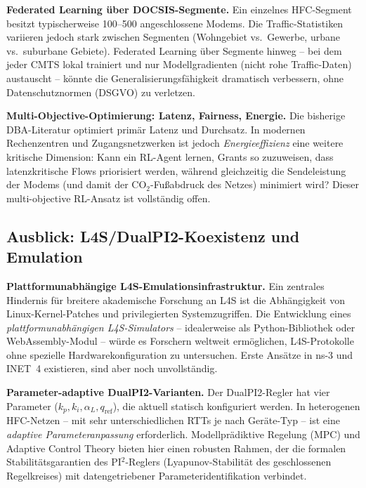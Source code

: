 ﻿\documentclass[a4paper,12pt]{article}
\theoremstyle{definition}
\begin{document}
\textbf{Federated Learning \"{u}ber DOCSIS-Segmente.}
Ein einzelnes HFC-Segment besitzt typischerweise 100--500 angeschlossene Modems.
Die Traffic-Statistiken variieren jedoch stark zwischen Segmenten (Wohngebiet
vs.\ Gewerbe, urbane vs.\ suburbane Gebiete). Federated Learning \"{u}ber
Segmente hinweg -- bei dem jeder CMTS lokal trainiert und nur Modellgradienten
(nicht rohe Traffic-Daten) austauscht -- k\"{o}nnte die Generalisierungsf\"{a}higkeit
dramatisch verbessern, ohne Datenschutznormen (DSGVO) zu verletzen.

\textbf{Multi-Objective-Optimierung: Latenz, Fairness, Energie.}
Die bisherige DBA-Literatur optimiert prim\"{a}r Latenz und Durchsatz. In modernen
Rechenzentren und Zugangsnetzwerken ist jedoch \emph{Energieeffizienz} eine
weitere kritische Dimension: Kann ein RL-Agent lernen, Grants so zuzuweisen,
dass latenzkritische Flows priorisiert werden, w\"{a}hrend gleichzeitig die
Sendeleistung der Modems (und damit der CO$_2$-Fu{\ss}abdruck des Netzes) minimiert wird?
Dieser multi-objective RL-Ansatz ist vollst\"{a}ndig offen.

\subsection{Ausblick: L4S/DualPI2-Koexistenz und Emulation}

\textbf{Plattformunabh\"{a}ngige L4S-Emulationsinfrastruktur.}
Ein zentrales Hindernis f\"{u}r breitere akademische Forschung an L4S ist die
Abh\"{a}ngigkeit von Linux-Kernel-Patches und privilegierten System\-zugriffen.
Die Entwicklung eines \emph{plattformunabh\"{a}ngigen L4S-Simulators} -- idealerweise
als Python-Bibliothek oder WebAssembly-Modul -- w\"{u}rde es Forschern weltweit
erm\"{o}glichen, L4S-Protokolle ohne spezielle Hardwarekonfiguration zu untersuchen.
Erste Ans\"{a}tze in ns-3 und INET~4 existieren, sind aber noch unvollst\"{a}ndig.

\textbf{Parameter-adaptive DualPI2-Varianten.}
Der DualPI2-Regler hat vier Parameter ($k_p, k_i, \alpha_L, q_{\mathrm{ref}}$),
die aktuell statisch konfiguriert werden. In heterogenen HFC-Netzen -- mit
sehr unterschiedlichen RTTs je nach Ger\"{a}te-Typ -- ist eine
\emph{adaptive Parameteranpassung} erforderlich. Modellprädiktive Regelung
(MPC) und Adaptive Control Theory bieten hier einen robusten Rahmen, der
die formalen Stabilitätsgarantien des PI$^2$-Reglers (Lyapunov-Stabilit\"{a}t
des geschlossenen Regelkreises) mit datengetriebener Parameteridentifikation
verbindet.
\end{document}
